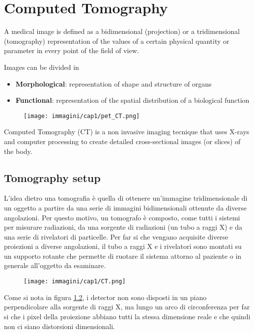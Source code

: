 \chapter{Computed Tomography}

A medical image is defined as a bidimensional (projection) or a tridimensional (tomography) representation of the values of a certain physical quantity or parameter in every point of the field of view. 

Images can be divided in 
\begin{itemize}
    \item \textbf{Morphological}: representation of shape and structure of organs 
    \item \textbf{Functional}: representation of the spatial distribution of a biological function 
\end{itemize}


\begin{figure}[ht]
    \centering
    \texttt{[image: immagini/cap1/pet\_CT.png]} 
    \caption{} 
    \label{fig:pet_CT} 
\end{figure}

Computed Tomography (CT) is a non invasive imaging tecnique that uses  X-rays and computer processing to create detailed cross-sectional images (or slices) of the body. 
\section{Tomography setup}
L'idea dietro una tomografia è quella di ottenere un'immagine tridimensionale di un oggetto a partire da una serie di immagini bidimensionali ottenute da diverse angolazioni.
Per questo motivo, un tomografo è composto, come tutti i sistemi per misurare radiazioni, da una sorgente di radiazioni (un tubo a raggi X) e da una serie di rivelatori di particelle. Per far si che vengano acquisite diverse proiezioni a diverse angolazioni, il tubo a raggi X e i rivelatori sono montati su un supporto rotante che permette di ruotare il sistema attorno al paziente o in generale all'oggetto da esaminare.
\begin{figure}[ht]
    \centering
    \texttt{[image: immagini/cap1/CT.png]} 
    \caption{} 
    \label{fig:tomografia}
\end{figure}

Come si nota in figura \ref{fig:tomografia}, i detector non sono disposti in un piano perpendicolare alla sorgente di raggi X, ma lungo un arco di circonferenza per far si che i pixel della proiezione abbiano tutti la stessa dimensione reale e che quindi non ci siano distorsioni dimensionali. 

